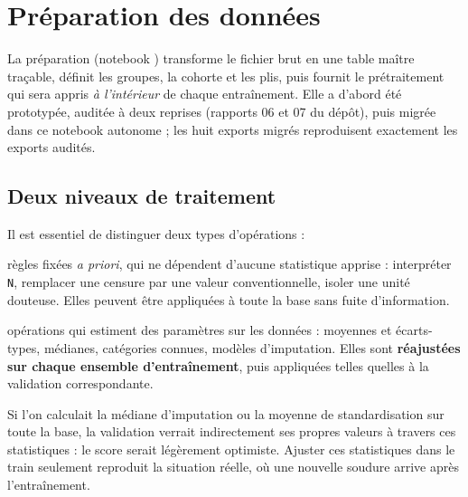 \clearpage
\section{Préparation des données}
\label{sec:prep}

La préparation (notebook ) transforme le
fichier brut en une table maître traçable, définit les groupes, la cohorte et
les plis, puis fournit le prétraitement qui sera appris \emph{à l'intérieur} de
chaque entraînement. Elle a d'abord été prototypée, auditée à deux reprises
(rapports 06 et 07 du dépôt), puis migrée dans ce notebook autonome ; les huit
exports migrés reproduisent exactement les exports audités.

\subsection{Deux niveaux de traitement}

Il est essentiel de distinguer deux types d'opérations :
\begin{description}[leftmargin=1em,style=nextline]
  \item[Nettoyage déterministe (global)] règles fixées \emph{a priori}, qui ne
  dépendent d'aucune statistique apprise : interpréter \texttt{N}, remplacer une
  censure par une valeur conventionnelle, isoler une unité douteuse. Elles
  peuvent être appliquées à toute la base sans fuite d'information.
  \item[Prétraitement appris (dans les plis)] opérations qui estiment des
  paramètres sur les données : moyennes et écarts-types, médianes, catégories
  connues, modèles d'imputation. Elles sont \textbf{réajustées sur chaque ensemble
  d'entraînement}, puis appliquées telles quelles à la validation correspondante.
\end{description}

\begin{intuition}
Si l'on calculait la médiane d'imputation ou la moyenne de standardisation sur
toute la base, la validation \og verrait \fg{} indirectement ses propres valeurs
à travers ces statistiques : le score serait légèrement optimiste. Ajuster ces
statistiques dans le train seulement reproduit la situation réelle, où une
nouvelle soudure arrive après l'entraînement.
\end{intuition}


